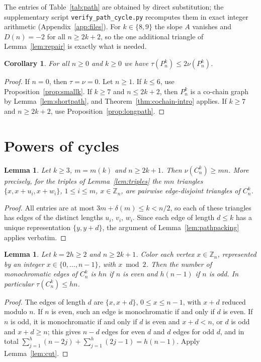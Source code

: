 \documentclass{amsart}
\newtheorem{lemma}[theorem]{Lemma}
\newtheorem{corollary}[theorem]{Corollary}
\theoremstyle{definition}
\theoremstyle{remark}
\numberwithin{equation}{section}
\numberwithin{table}{section}
\newcommand{\Z}{\mathbb{Z}}
\begin{document}
The entries of Table~\ref{tab:path} are obtained by direct substitution; the supplementary script \texttt{verify\_path\_cycle.py} recomputes them in exact integer arithmetic (Appendix~\ref{app:files}). For $k\in\{8,9\}$ the slope $A$ vanishes and $D(n)=-2$ for all $n\ge2k+2$, so the one additional triangle of Lemma~\ref{lem:repair} is exactly what is needed.

\begin{corollary}\label{cor:paths}
For all $n\ge0$ and $k\ge0$ we have $\tau(P_n^k)\le2\nu(P_n^k)$.
\end{corollary}

\begin{proof}
If $n=0$, then $\tau=\nu=0$. Let $n\ge1$. If $k\le6$, use Proposition~\ref{prop:smallk}. If $k\ge7$ and $n\le2k+2$, then $P_n^k$ is a co-chain graph by Lemma~\ref{lem:shortpath}, and Theorem~\ref{thm:cochain-intro} applies. If $k\ge7$ and $n\ge2k+2$, use Proposition~\ref{prop:longpath}.
\end{proof}

\section{Powers of cycles}\label{sec:cycles}

\begin{lemma}\label{lem:cyclepacking}
Let $k\ge3$, $m=m(k)$ and $n\ge2k+1$. Then $\nu(C_n^k)\ge mn$. More precisely, for the triples of Lemma~\ref{lem:triples} the $mn$ triangles $\{x,x+u_i,x+w_i\}$, $1\le i\le m$, $x\in\Z_n$, are pairwise edge-disjoint triangles of $C_n^k$.
\end{lemma}

\begin{proof}
All entries are at most $3m+\delta(m)\le k<n/2$, so each of these triangles has edges of the distinct lengths $u_i$, $v_i$, $w_i$. Since each edge of length $d\le k$ has a unique representation $\{y,y+d\}$, the argument of Lemma~\ref{lem:pathpacking} applies verbatim.
\end{proof}

\begin{lemma}\label{lem:evencover}
Let $k=2h\ge2$ and $n\ge2k+1$. Color each vertex $x\in\Z_n$, represented by an integer $x\in\{0,\dots,n-1\}$, with $x\bmod2$. Then the number of monochromatic edges of $C_n^k$ is $hn$ if $n$ is even and $h(n-1)$ if $n$ is odd. In particular $\tau(C_n^k)\le hn$.
\end{lemma}

\begin{proof}
The edges of length $d$ are $\{x,x+d\}$, $0\le x\le n-1$, with $x+d$ reduced modulo $n$. If $n$ is even, such an edge is monochromatic if and only if $d$ is even. If $n$ is odd, it is monochromatic if and only if $d$ is even and $x+d<n$, or $d$ is odd and $x+d\ge n$; this gives $n-d$ edges for even $d$ and $d$ edges for odd $d$, and in total $\sum_{j=1}^h(n-2j)+\sum_{j=1}^h(2j-1)=h(n-1)$. Apply Lemma~\ref{lem:cut}.
\end{proof}
\end{document}
